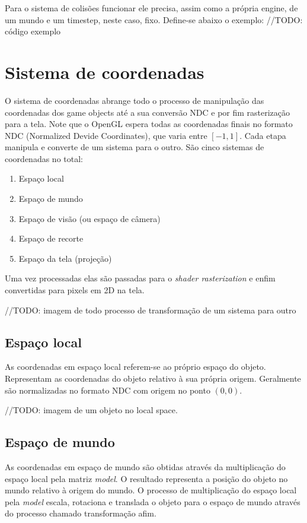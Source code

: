 \documentclass[12pt, 
openright, 
oneside, 
a4paper,    
brazil]{facom-ufu-abntex2}
\begin{document}
Para o sistema de colisões funcionar ele precisa, assim como a própria engine, de um mundo e um timestep, neste caso, fixo. Define-se abaixo o exemplo:
//TODO: código exemplo

\section{Sistema de coordenadas}

O sistema de coordenadas abrange todo o processo de manipulação das coordenadas dos game objects até a sua conversão NDC e por fim rasterização para a tela. Note que o OpenGL espera todas as coordenadas finais no formato NDC (Normalized Devide Coordinates), que varia entre $[-1,1]$. Cada etapa manipula e converte de um sistema para o outro. São cinco sistemas de coordenadas no total:

\begin{enumerate}
    \item Espaço local
    \item Espaço de mundo
    \item Espaço de visão (ou espaço de câmera)
    \item Espaço de recorte
    \item Espaço da tela (projeção)
\end{enumerate}

Uma vez processadas elas são passadas para o \textit{shader rasterization} e enfim convertidas para pixels em 2D na tela.

//TODO: imagem de todo processo de transformação de um sistema para outro

\subsection{Espaço local}
As coordenadas em espaço local referem-se ao próprio espaço do objeto. Representam as coordenadas do objeto relativo à sua própria origem. Geralmente são normalizadas no formato NDC com origem no ponto $(0,0)$.

//TODO: imagem de um objeto no local space.

\subsection{Espaço de mundo}
As coordenadas em espaço de mundo são obtidas através da multiplicação do espaço local pela matriz \textit{model}. O resultado representa a posição do objeto no mundo relativo à origem do mundo. O processo de multiplicação do espaço local pela \textit{model} escala, rotaciona e translada o objeto para o espaço de mundo através do processo chamado transformação afim.
\end{document}
